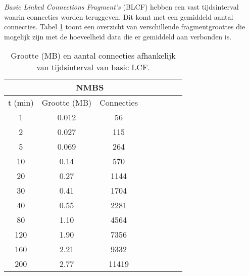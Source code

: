 \textit{Basic Linked Connections Fragment's} (BLCF) hebben een vast tijdsinterval waarin connecties worden teruggeven. Dit komt met een gemiddeld aantal connecties. Tabel \ref{table:grootte-tijd} toont een overzicht van verschillende fragmentgroottes die mogelijk zijn met de hoeveelheid data die er gemiddeld aan verbonden is.


\begin{table}[htbp]
\centering
\begin{tabular}{ | c || c | c | c | c | c | c | c | }
  \hline
  & \multicolumn{2}{|c|}{NMBS} \\ \hline
  t (min) &	Grootte (MB) &	Connecties \\ \hline
 1 &	0.012 & 56  \\
 2 &	0.027 & 115  \\
 5 & 0.069 & 264  \\
10 &	0.14 & 570  \\
20 &	0.27 & 1144 \\
30 & 0.41	& 1704  \\
40 &	0.55	& 2281  \\
80 &	1.10	& 4564  \\
120 & 1.90 & 7356  \\
160 & 2.21 & 9332  \\
200 & 2.77 & 11419  \\	
\hline  
\end{tabular}
\caption{Grootte (MB) en aantal connecties afhankelijk van tijdsinterval van basic LCF.}
\label{table:grootte-tijd}
\end{table}

